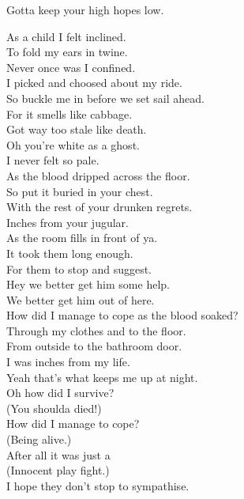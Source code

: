 Gotta keep your high hopes low. \\




As a child I felt inclined. \\
To fold my ears in twine. \\
Never once was I confined. \\
I picked and choosed about my ride. \\
So buckle me in before we set sail ahead. \\
For it smells like cabbage. \\
Got way too stale like death. \\

Oh you're white as a ghost. \\
I never felt so pale. \\
As the blood dripped across the floor. \\

So put it buried in your chest. \\
With the rest of your drunken regrets. \\
Inches from your jugular. \\
As the room fills in front of ya. \\
It took them long enough. \\
For them to stop and suggest. \\
Hey we better get him some help. \\
We better get him out of here. \\

How did I manage to cope as the blood soaked? \\
Through my clothes and to the floor. \\
From outside to the bathroom door. \\
I was inches from my life. \\
Yeah that's what keeps me up at night. \\

Oh how did I survive? \\
(You shoulda died!) \\
How did I manage to cope? \\
(Being alive.) \\
After all it was just a \\
(Innocent play fight.) \\
I hope they don't stop to sympathise. \\

